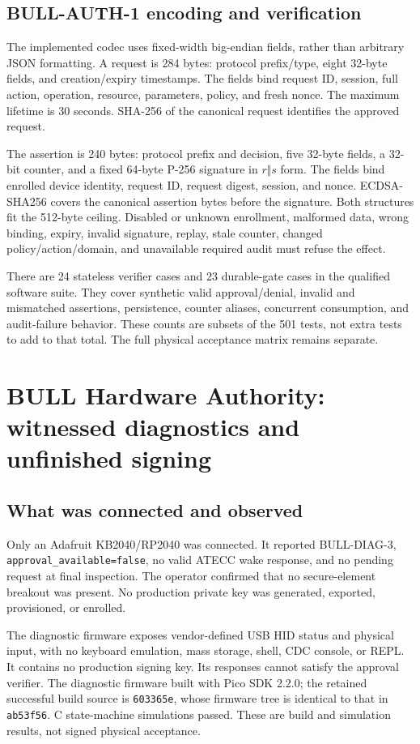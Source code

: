 \documentclass[journal]{IEEEtran}
\newcommand{\code}[1]{\texttt{#1}}
\begin{document}
\subsection{BULL-AUTH-1 encoding and verification}
The implemented codec uses fixed-width big-endian fields, rather than arbitrary JSON formatting. A request is 284 bytes: protocol prefix/type, eight 32-byte fields, and creation/expiry timestamps. The fields bind request ID, session, full action, operation, resource, parameters, policy, and fresh nonce. The maximum lifetime is 30 seconds. SHA-256 of the canonical request identifies the approved request.

The assertion is 240 bytes: protocol prefix and decision, five 32-byte fields, a 32-bit counter, and a fixed 64-byte P-256 signature in $r\Vert s$ form. The fields bind enrolled device identity, request ID, request digest, session, and nonce. ECDSA-SHA256 covers the canonical assertion bytes before the signature. Both structures fit the 512-byte ceiling. Disabled or unknown enrollment, malformed data, wrong binding, expiry, invalid signature, replay, stale counter, changed policy/action/domain, and unavailable required audit must refuse the effect.

There are 24 stateless verifier cases and 23 durable-gate cases in the qualified software suite. They cover synthetic valid approval/denial, invalid and mismatched assertions, persistence, counter aliases, concurrent consumption, and audit-failure behavior. These counts are subsets of the 501 tests, not extra tests to add to that total. The full physical acceptance matrix remains separate.

\section{BULL Hardware Authority: witnessed diagnostics and unfinished signing}
\subsection{What was connected and observed}
Only an Adafruit KB2040/RP2040 was connected. It reported BULL-DIAG-3, \code{approval\_available=false}, no valid ATECC wake response, and no pending request at final inspection. The operator confirmed that no secure-element breakout was present. No production private key was generated, exported, provisioned, or enrolled.

The diagnostic firmware exposes vendor-defined USB HID status and physical input, with no keyboard emulation, mass storage, shell, CDC console, or REPL. It contains no production signing key. Its responses cannot satisfy the approval verifier. The diagnostic firmware built with Pico SDK 2.2.0; the retained successful build source is \code{603365e}, whose firmware tree is identical to that in \code{ab53f56}. C state-machine simulations passed. These are build and simulation results, not signed physical acceptance.
\end{document}
